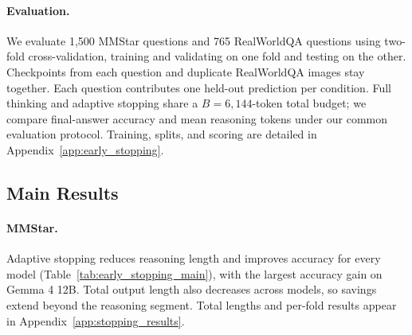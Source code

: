 \documentclass{article} %
\begin{document}
\paragraph{Evaluation.}
We evaluate 1,500 MMStar questions \citep{chen2024we} and 765 RealWorldQA questions \citep{xai2024realworldqa} using two-fold cross-validation, training and validating on one fold and testing on the other. Checkpoints from each question and duplicate RealWorldQA images stay together. Each question contributes one held-out prediction per condition. Full thinking and adaptive stopping share a $B=6{,}144$-token total budget; we compare final-answer accuracy and mean reasoning tokens under our common evaluation protocol. Training, splits, and scoring are detailed in Appendix~\ref{app:early_stopping}.

\subsection{Main Results}

\paragraph{MMStar.}
Adaptive stopping reduces reasoning length and improves accuracy for every model (Table~\ref{tab:early_stopping_main}), with the largest accuracy gain on Gemma 4 12B. Total output length also decreases across models, so savings extend beyond the reasoning segment. Total lengths and per-fold results appear in Appendix~\ref{app:stopping_results}.
\end{document}
